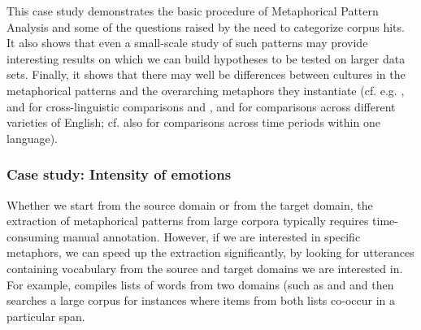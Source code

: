 This case study demonstrates the basic procedure of Metaphorical  Pattern Analysis  and some of the questions raised by the need to categorize  corpus hits. It also shows that even a small\hyp{}scale study of such patterns may provide interesting results on which we can build hypotheses to be tested on larger  data sets. Finally, it shows that there may well be differences between cultures  in the metaphorical  patterns and the overarching metaphors they instantiate (cf. e.g. \citealt{rojo_lopez_metaphorical_2010}, \citealt{rojo_lopez_distinguishing_2013} and \citealt{ogarkova_emotion_2014} for cross\hyp{}linguistic comparisons and \citealt{diaz-vera_exploring_2013}, \citealt{diaz-vera_love_2015} and \citealt{guldenring_emotion_2017} for comparisons across different varieties  of English; cf. also \citealt{tissari_lovescapes:_2003, tissari_english_2010} for comparisons across time periods within one language).

\subsubsection{Case study: Intensity of emotions}
\label{sec:fillintensity}

Whether we start from the source domain or from the target domain, the extraction of metaphorical  patterns from large  corpora typically requires time\hyp{}consuming manual  annotation.  However, if we are interested in specific metaphors, we can speed up the extraction  significantly, by looking for utterances containing vocabulary from the source and target domains we are interested in. For example, \citet{martin_corpus-based_2006} compiles lists of words from two domains (such as  and  and then searches a large  corpus for instances where items from both lists co\hyp{}occur in a particular  span.

